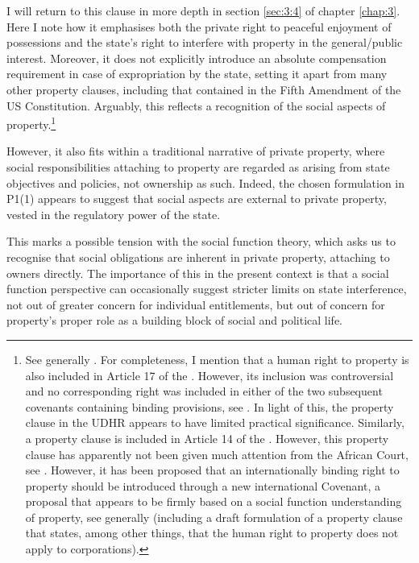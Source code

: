 I will return to this clause in more depth in section \ref{sec:3:4} of chapter \ref{chap:3}. Here I note how it emphasises both the private right to peaceful enjoyment of possessions and the state's right to interfere with property in the general/public interest. Moreover, it does not explicitly introduce an absolute compensation requirement in case of expropriation by the state, setting it apart from many other property clauses, including that contained in the Fifth Amendment of the US Constitution. Arguably, this reflects a recognition of the social aspects of property.\footnote{See generally \cite{allen10}. For completeness, I mention that a human right to property is also included in Article 17 of the \cite{udhr}. However, its inclusion was controversial and no corresponding right was included in either of the two subsequent covenants containing binding provisions, see \cite{fne,fnp}. In light of this, the property clause in the UDHR appears to have limited practical significance. Similarly, a property clause is included in Article 14 of the \cite{banjul}. However, this property clause has apparently not been given much attention from the African Court, see \cite[83]{walt11}. However, it has been proposed that an internationally binding right to property should be introduced through a new international Covenant, a proposal that appears to be firmly based on a social function understanding of property, see generally \cite{hassmann13} (including a draft formulation of a property clause that states, among other things, that the human right to property does not apply to corporations).}

However, it also fits within a traditional narrative of private property, where social responsibilities attaching to property are regarded as arising from state objectives and policies, not ownership as such. Indeed, the chosen formulation in P1(1) appears to suggest that social aspects are external to private property, vested in the regulatory power of the state.

This marks a possible tension with the social function theory, which asks us to recognise that social obligations are inherent in private property, attaching to owners directly. The importance of this in the present context is that a social function perspective can occasionally suggest stricter limits on state interference, not out of greater concern for individual entitlements, but out of concern for property's proper role as a building block of social and political life.

